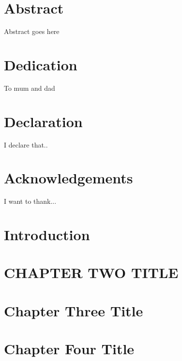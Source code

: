 \chapter*{Abstract}
Abstract goes here
 
\chapter*{Dedication}
To mum and dad
 
\chapter*{Declaration}
I declare that..
 
\chapter*{Acknowledgements}
I want to thank...



\mainmatter %

\chapter{Introduction}
 
\chapter{CHAPTER TWO TITLE}
 
\chapter{Chapter Three Title}
 
\chapter{Chapter Four Title}
 
